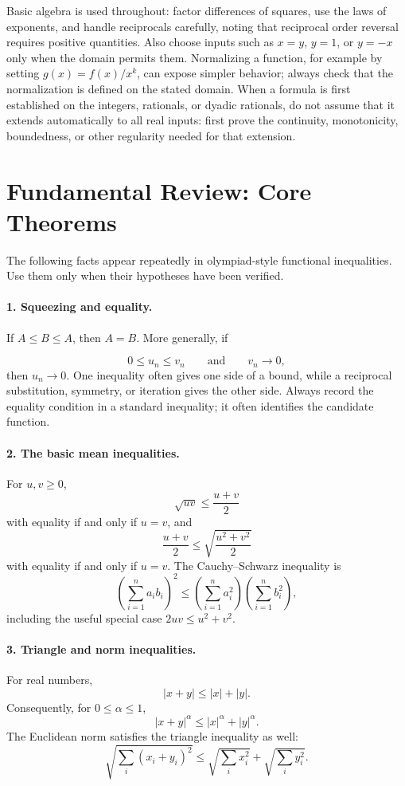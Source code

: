 \documentclass[12pt,a4paper]{article}
\begin{document}
Basic algebra is used throughout: factor differences of squares, use the laws
of exponents, and handle reciprocals carefully, noting that reciprocal order
reversal requires positive quantities. Also choose inputs such as $x=y$,
$y=1$, or $y=-x$ only when the domain permits them. Normalizing a function,
for example by setting $g(x)=f(x)/x^k$, can expose simpler behavior; always
check that the normalization is defined on the stated domain. When a formula
is first established on the integers, rationals, or dyadic rationals, do not
assume that it extends automatically to all real inputs: first prove the
continuity, monotonicity, boundedness, or other regularity needed for that
extension.

\section*{Fundamental Review: Core Theorems}

The following facts appear repeatedly in olympiad-style functional
inequalities. Use them only when their hypotheses have been verified.

\paragraph{1. Squeezing and equality.}
If $A\le B\le A$, then $A=B$. More generally, if

\[
0\le u_n\le v_n\qquad\text{and}\qquad v_n\to0,
\]
then $u_n\to0$. One inequality often gives one side of a bound, while a
reciprocal substitution, symmetry, or iteration gives the other side. Always
record the equality condition in a standard inequality; it often identifies
the candidate function.

\paragraph{2. The basic mean inequalities.}
For $u,v\ge0$,
\[
\sqrt{uv}\le \frac{u+v}{2}
\]
with equality if and only if $u=v$, and
\[
\frac{u+v}{2}\le
\sqrt{\frac{u^2+v^2}{2}}
\]
with equality if and only if $u=v$. The Cauchy--Schwarz inequality is
\[
\left(\sum_{i=1}^n a_i b_i\right)^2
\le
\left(\sum_{i=1}^n a_i^2\right)
\left(\sum_{i=1}^n b_i^2\right),
\]
including the useful special case $2uv\le u^2+v^2$.

\paragraph{3. Triangle and norm inequalities.}
For real numbers,
\[
|x+y|\le |x|+|y|.
\]
Consequently, for $0\le\alpha\le1$,
\[
|x+y|^\alpha\le |x|^\alpha+|y|^\alpha.
\]
The Euclidean norm satisfies the triangle inequality as well:
\[
\sqrt{\sum_i(x_i+y_i)^2}
\le \sqrt{\sum_i x_i^2}+\sqrt{\sum_i y_i^2}.
\]
\end{document}
